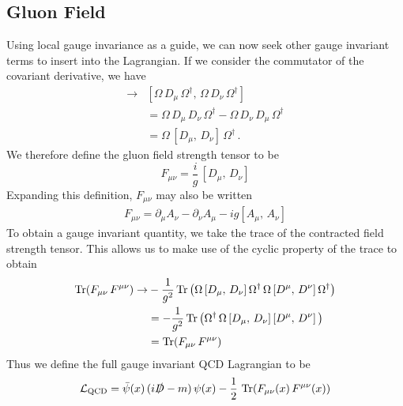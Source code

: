 \subsection{Gluon Field}
Using local gauge invariance as a guide, we can now seek other gauge invariant terms to insert into the Lagrangian. If we consider the commutator of the covariant derivative, we have
%
\begin{align*}
[D_\mu,\, D_\nu]\rightarrow &[\Omega\,D_\mu\,\Omega^\dag,\,\Omega\,D_\nu\,\Omega^\dag]\\
&= \Omega\,D_\mu\, D_\nu\,\Omega^\dag - \Omega\,D_\nu\, D_\mu\,\Omega^\dag\\
&= \Omega\,[D_\mu,\,D_\nu]\,\Omega^\dag\, .
\end{align*}
%
We therefore define the gluon field strength tensor to be
%
\begin{equation}
F_{\mu\nu} = \frac{i}{g}\,[D_\mu,\, D_\nu]
\end{equation}
%
Expanding this definition, $F_{\mu\nu}$ may also be written
%
\begin{align}
F_{\mu\nu}=\partial_\mu A_\nu - \partial_\nu A_\mu - ig[A_\mu,\,A_\nu]
\label{eq:FieldStrengthTensor}
\end{align}
%
To obtain a gauge invariant quantity, we take the trace of the contracted field strength tensor. This allows us to make use of the cyclic property of the trace to obtain
%
\begin{align*}
\operatorname{Tr}(F_{\mu\nu}\,F^{\mu\nu})\rightarrow&-\frac{1}{g^2}\operatorname{Tr}\left(\Omega\,[D_\mu,\,D_\nu]\,\Omega^\dag\,\Omega\,[D^\mu,\,D^\nu]\,\Omega^\dag\right)\\
&=-\frac{1}{g^2}\operatorname{Tr}\left(\Omega^\dag\,\Omega\,[D_\mu,\,D_\nu]\,[D^\mu,\,D^\nu]\,\right)\\
&=\operatorname{Tr}(F_{\mu\nu}\,F^{\mu\nu})
\end{align*}
%
Thus we define the full gauge invariant QCD Lagrangian to be
%
\begin{equation}
\mathcal{L_{\text{QCD}}}=\bar{\psi}(x)\,(i\slashed{D}-m)\,\psi(x)-\frac{1}{2}\,\operatorname{Tr}(F_{\mu\nu}(x)\,F^{\mu\nu}(x))
\label{eq:QCDLagrangian}
\end{equation}\\

